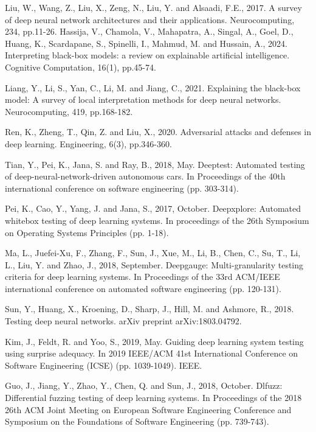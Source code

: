 \documentclass[10pt, conference, a4paper, final]{IEEEtran}
\begin{document}
\begin{thebibliography}{01}

    Liu, W., Wang, Z., Liu, X., Zeng, N., Liu, Y. and Alsaadi, F.E., 2017. A survey of deep neural network architectures and their applications. Neurocomputing, 234, pp.11-26.
    Hassija, V., Chamola, V., Mahapatra, A., Singal, A., Goel, D., Huang, K., Scardapane, S., Spinelli, I., Mahmud, M. and Hussain, A., 2024. Interpreting black-box models: a review on explainable artificial intelligence. Cognitive Computation, 16(1), pp.45-74.

    Liang, Y., Li, S., Yan, C., Li, M. and Jiang, C., 2021. Explaining the black-box model: A survey of local interpretation methods for deep neural networks. Neurocomputing, 419, pp.168-182.
    
    Ren, K., Zheng, T., Qin, Z. and Liu, X., 2020. Adversarial attacks and defenses in deep learning. Engineering, 6(3), pp.346-360.

    Tian, Y., Pei, K., Jana, S. and Ray, B., 2018, May. Deeptest: Automated testing of deep-neural-network-driven autonomous cars. In Proceedings of the 40th international conference on software engineering (pp. 303-314).
    
     Pei, K., Cao, Y., Yang, J. and Jana, S., 2017, October. Deepxplore: Automated whitebox testing of deep learning systems. In proceedings of the 26th Symposium on Operating Systems Principles (pp. 1-18).

    Ma, L., Juefei-Xu, F., Zhang, F., Sun, J., Xue, M., Li, B., Chen, C., Su, T., Li, L., Liu, Y. and Zhao, J., 2018, September. Deepgauge: Multi-granularity testing criteria for deep learning systems. In Proceedings of the 33rd ACM/IEEE international conference on automated software engineering (pp. 120-131).
    
    Sun, Y., Huang, X., Kroening, D., Sharp, J., Hill, M. and Ashmore, R., 2018. Testing deep neural networks. arXiv preprint arXiv:1803.04792.

    Kim, J., Feldt, R. and Yoo, S., 2019, May. Guiding deep learning system testing using surprise adequacy. In 2019 IEEE/ACM 41st International Conference on Software Engineering (ICSE) (pp. 1039-1049). IEEE.
  
    Guo, J., Jiang, Y., Zhao, Y., Chen, Q. and Sun, J., 2018, October. Dlfuzz: Differential fuzzing testing of deep learning systems. In Proceedings of the 2018 26th ACM Joint Meeting on European Software Engineering Conference and Symposium on the Foundations of Software Engineering (pp. 739-743).


\end{thebibliography}
\end{document}
